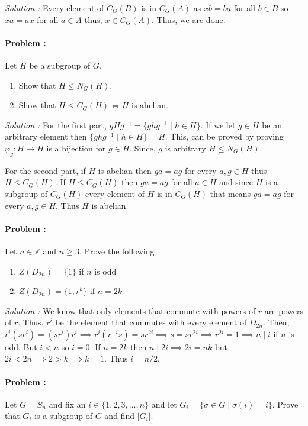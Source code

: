 \vspace{4mm}
\textit{Solution :} Every element of $C_G(B)$ is in $C_G(A)$ as $xb=ba$ for all $b \in B$ so $xa = ax$ for all $a \in A$ thus, $x \in C_G(A)$.
Thus, we are done.

\paragraph{Problem :} Let $H$ be a subgroup of $G$.
\begin{enumerate}
    \item Show that $H \le N_G(H)$. 
    \item Show that $H \le C_G(H) \iff H$ is abelian.  
\end{enumerate}

\vspace{4mm}
\textit{Solution :}
For the first part, $gHg^{-1}=\{ghg^{-1} \mid h \in H\}$. If we let $g \in H$ be an arbitrary element then $\{ghg^{-1} \mid h \in H\}=H$. This,
can be proved by proving $\varphi_g : H \to H$ is a bijection for $g \in H$. Since, $g$ is arbitrary $H \le N_G(H)$.

For the second part, if $H$ is abelian then $g a = a g $ for every $a,g \in H$ thus $H \le C_G(H)$. If $H \le C_G(H)$ then $g a = a g$ for all
$a \in H$ and since $H$ is a subgroup of $C_G(H)$ every element of $H$ is in $C_G(H)$ that means $g a = a g$ for every $a,g \in H$. Thus
$H$ is abelian.

\paragraph{Problem :} Let $n \in \mathbb{Z}$ and $n \ge 3$. Prove the following
\begin{enumerate}
    \item $Z(D_{2n}) = \{1\}$ if $n$ is odd
    \item $Z(D_{2n}) = \{1,r^k\}$ if $n=2k$ 
\end{enumerate}

\vspace{4mm}
\textit{Solution :} We know that only elements that commute with powers of $r$ are powers of $r$. Thus, $r^i$ be the element that commutes with 
every element of $D_{2n}$. Then, $r^i (sr^i)=(sr^i)r^i \implies r^i(r^{-i}s) = s r^{2i} \implies s = s r^{2i} \implies r^{2i}=1 
\implies n \mid i$ if $n$ is odd. But $i < n$ so $i=0$. If $n=2k$ then $n \mid 2i \implies 2i = nk$ but $2i < 2n \implies 2 > k \implies k=1$.
Thus $i=n/2$.  

\paragraph{Problem :} Let $G=S_n$ and fix an $i \in \{1,2,3,\ldots,n\}$ and let $G_i=\{\sigma \in G \mid \sigma(i)=i\}$. Prove that $G_i$ is a
subgroup of $G$ and find $|G_i|$.

